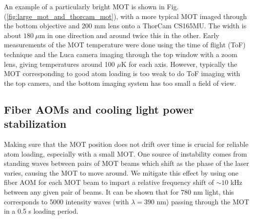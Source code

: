An example of a particularly bright MOT is shown in Fig. (\ref{fig:large_mot_and_thorcam_mot}), with a more typical MOT imaged through the bottom objective and 200 mm lens onto a ThorCam CS165MU. The width is about $180~\mu$m in one direction and around twice this in the other. Early measurements of the MOT temperature were done using the time of flight (ToF) technique and the Luca camera imaging through the top window with a zoom lens, giving temperatures around 100 $\mu$K for each axis. However, typically the MOT corresponding to good atom loading is too weak to do ToF imaging with the top camera, and the bottom imaging system has too small a field of view.

\subsection{Fiber AOMs and cooling light power stabilization}\label{sec:fiber_AOM_power_stabilization}

Making sure that the MOT position does not drift over time is crucial for reliable atom loading, especially with a small MOT. One source of instability comes from standing waves between pairs of MOT beams which shift as the phase of the laser varies, causing the MOT to move around. We mitigate this effect by using one fiber AOM for each MOT beam to impart a relative frequency shift of $\sim 10$ kHz between any given pair of beams. It can be shown that for $780$ nm light, this corresponds to 5000 intensity waves (with $\lambda=390$ nm) passing through the MOT in a 0.5 s loading period. 

